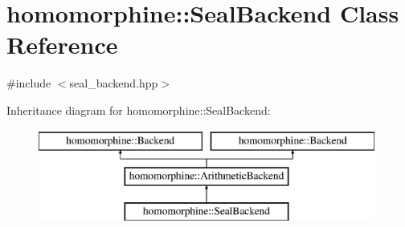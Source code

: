 \hypertarget{classhomomorphine_1_1_seal_backend}{}\section{homomorphine\+::Seal\+Backend Class Reference}
\label{classhomomorphine_1_1_seal_backend}


{\ttfamily \#include $<$seal\+\_\+backend.\+hpp$>$}

Inheritance diagram for homomorphine\+::Seal\+Backend\+:\begin{figure}[H]
\begin{center}
\leavevmode
\includegraphics[height=3.000000cm]{classhomomorphine_1_1_seal_backend}
\end{center}
\end{figure}

